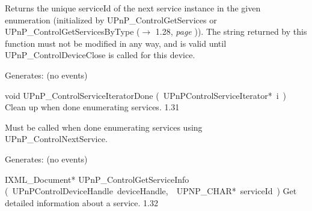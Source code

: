 \documentclass{article}
\begin{document}
\begin{cxxentry}
\begin{cxxfunction}
\begin{cxxdoc}
Returns the unique serviceId of the next service instance in the
given enumeration (initialized by UPnP\_ControlGetServices or
UPnP\_ControlGetServicesByType ($\rightarrow$ 1.28, {\em page }\pageref{cxx.1.28})).  The string returned by this
function must not be modified in any way, and is valid until
UPnP\_ControlDeviceClose is called for this device.

Generates:
(no events)


\end{cxxdoc}
\end{cxxfunction}
\begin{cxxfunction}
{void}
        {UPnP\_ControlServiceIteratorDone}
        {(\ UPnPControlServiceIterator*\ i\ )}
        {Clean up when done enumerating services. }
        {1.31}
\begin{cxxdoc}

Must be called when done enumerating services using
UPnP\_ControlNextService.

Generates:
(no events)


\end{cxxdoc}
\end{cxxfunction}
\begin{cxxfunction}
{IXML\_Document*}
        {UPnP\_ControlGetServiceInfo}
        {(\ UPnPControlDeviceHandle\ deviceHandle,\ \ UPNP\_CHAR*\ serviceId\ )}
        {Get detailed information about a service. }
        {1.32}
\begin{cxxdoc}


\end{cxxdoc}
\end{cxxfunction}
\end{cxxentry}
\end{document}
